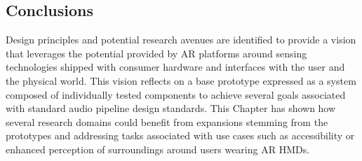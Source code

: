 \subsection{Conclusions}
Design principles and potential research avenues are identified to provide a vision that leverages the potential provided by AR platforms around sensing technologies shipped with consumer hardware and interfaces with the user and the physical world. This vision reflects on a base prototype expressed as a system composed of individually tested components to achieve several goals associated with standard audio pipeline design standards. This Chapter has shown how several research domains could benefit from expansions stemming from the prototypes and addressing tasks associated with use cases such as accessibility or enhanced perception of surroundings around users wearing AR HMDs.
